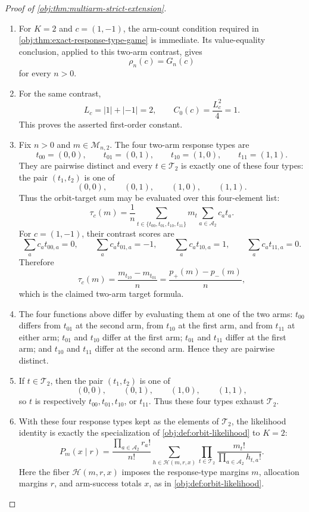 \documentclass[11pt]{article}
\begin{document}
\begin{proof}[Proof of \cref{obj:thm:multiarm-strict-extension}]
\begin{enumerate}
\item For \(K=2\) and \(c=(1,-1)\), the arm-count condition required in \cref{obj:thm:exact-response-type-game} is immediate. Its value-equality conclusion, applied to this two-arm contrast, gives
\[
\rho_n(c)=G_n(c)
\]
for every \(n>0\). %

\item For the same contrast,
\[
L_c=|1|+|-1|=2,
\qquad
C_0(c)=\frac{L_c^2}{4}=1 .
\]
This proves the asserted first-order constant. %

\item Fix \(n>0\) and \(m\in\mathcal M_{n,2}\). The four two-arm response types are
\[
t_{00}=(0,0),\qquad
t_{01}=(0,1),\qquad
t_{10}=(1,0),\qquad
t_{11}=(1,1).
\]
They are pairwise distinct and every \(t\in\mathcal T_2\) is exactly one of these four types: the pair \((t_1,t_2)\) is one of
\[
(0,0),\qquad (0,1),\qquad (1,0),\qquad (1,1).
\]
Thus the orbit-target sum may be evaluated over this four-element list:
\[
\tau_c(m)
=
\frac{1}{n}\sum_{t\in\{t_{00},t_{01},t_{10},t_{11}\}}m_t\sum_{a\in\mathcal A_2}c_a t_a .
\]
For \(c=(1,-1)\), their contrast scores are
\[
\sum_a c_a t_{00,a}=0,\qquad
\sum_a c_a t_{01,a}=-1,\qquad
\sum_a c_a t_{10,a}=1,\qquad
\sum_a c_a t_{11,a}=0 .
\]
Therefore
\[
\tau_c(m)
=
\frac{m_{t_{10}}-m_{t_{01}}}{n}
=
\frac{p_+(m)-p_-(m)}{n},
\]
which is the claimed two-arm target formula. %

\item The four functions above differ by evaluating them at one of the two arms: \(t_{00}\) differs from \(t_{01}\) at the second arm, from \(t_{10}\) at the first arm, and from \(t_{11}\) at either arm; \(t_{01}\) and \(t_{10}\) differ at the first arm; \(t_{01}\) and \(t_{11}\) differ at the first arm; and \(t_{10}\) and \(t_{11}\) differ at the second arm. Hence they are pairwise distinct. %

\item If \(t\in\mathcal T_2\), then the pair \((t_1,t_2)\) is one of
\[
(0,0),\qquad (0,1),\qquad (1,0),\qquad (1,1),
\]
so \(t\) is respectively \(t_{00},t_{01},t_{10}\), or \(t_{11}\). Thus these four types exhaust \(\mathcal T_2\). %

\item With these four response types kept as the elements of \(\mathcal T_2\), the likelihood identity is exactly the specialization of \cref{obj:def:orbit-likelihood} to \(K=2\):
\[
P_m(x\mid r)
=
\frac{\prod_{a\in\mathcal A_2} r_a!}{n!}
\sum_{h\in\mathcal H(m,r,x)}
\prod_{t\in\mathcal T_2}
\frac{m_t!}{\prod_{a\in\mathcal A_2} h_{t,a}!}.
\]
Here the fiber \(\mathcal H(m,r,x)\) imposes the response-type margins \(m\), allocation margins \(r\), and arm-success totals \(x\), as in \cref{obj:def:orbit-likelihood}. %


\end{enumerate}
\end{proof}
\end{document}
